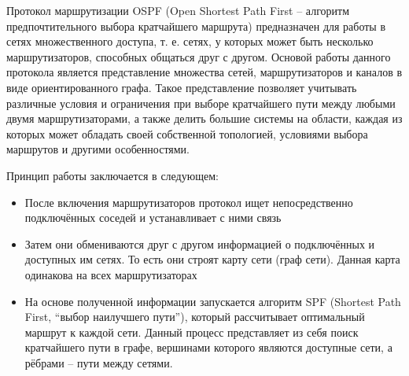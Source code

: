 Протокол маршрутизации OSPF (Open Shortest Path First – алгоритм предпочтительного выбора кратчайшего маршрута) предназначен для работы в сетях множественного доступа, т. е. сетях, у которых может быть несколько маршрутизаторов, способных общаться друг с другом. Основой работы данного протокола является представление множества сетей, маршрутизаторов и каналов в виде ориентированного графа. Такое представление позволяет учитывать различные условия и ограничения при выборе кратчайшего пути между любыми двумя маршрутизаторами, а также делить большие системы на области, каждая из которых может обладать своей собственной топологией, условиями выбора маршрутов и другими особенностями.

Принцип работы заключается в следующем:
\begin{itemize}
	\item После включения маршрутизаторов протокол ищет непосредственно подключённых соседей и устанавливает с ними связь
	\item Затем они обмениваются друг с другом информацией о подключённых и доступных им сетях. То есть они строят карту сети (граф сети). Данная карта одинакова на всех маршрутизаторах
	\item На основе полученной информации запускается алгоритм SPF (Shortest Path First, ``выбор наилучшего пути''), который рассчитывает оптимальный маршрут к каждой сети. Данный процесс представляет из себя поиск кратчайшего пути в графе, вершинами которого являются доступные сети, а рёбрами -- пути между сетями.
\end{itemize}
